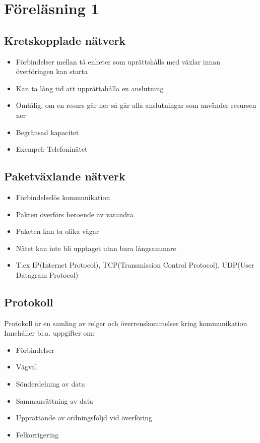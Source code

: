 \documentclass[12pt,a4paper]{article}
\begin{document}
\section{Föreläsning 1}
\subsection{Kretskopplade nätverk}
\begin{itemize}
    \item Förbindelser mellan tå enheter som uprättshålls med växlar innan överföringen kan starta
    \item Kan ta lång tid att upprättahålla en anslutning
    \item Ömtålig, om en resurs går ner så går alla anslutningar som använder resursen ner
    \item Begränsad kapacitet
    \item Exempel: Telefoninätet
\end{itemize}

\subsection{Paketväxlande nätverk}
\begin{itemize}
    \item Förbindelselös kommunikation
    \item Pakten överförs beroende av varandra
    \item Paketen kan ta olika vägar
    \item Nätet kan inte bli upptaget utan bara långsammare
    \item T.ex IP(Internet Protocol), TCP(Transmission Control Protocol), UDP(User Datagram Protocol)
\end{itemize}

\subsection{Protokoll}
Protokoll är en samling av relger och överrenskommelser kring kommunikation 
Innehåller bl.a. uppgifter om:
\begin{itemize}
    \item Förbindelser
    \item Vägval
    \item Sönderdelning av data
    \item Sammansättning av data
    \item Upprättande av ordningsföljd vid överföring
    \item Felkorrigering
\end{itemize}
\end{document}
